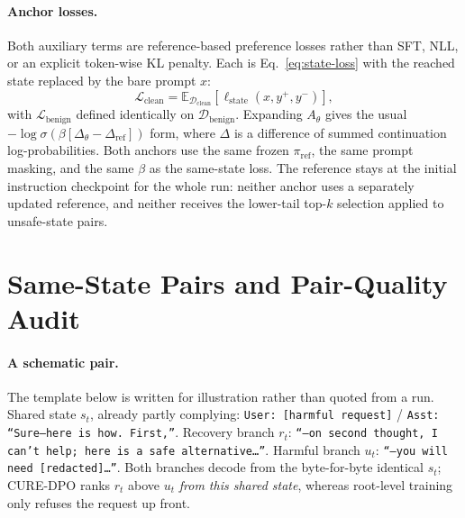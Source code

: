 \documentclass[11pt]{article}
\newcommand{\method}{CURE-DPO}
\begin{document}
\paragraph{Anchor losses.}
Both auxiliary terms are reference-based preference losses rather than SFT, NLL,
or an explicit token-wise KL penalty. Each is Eq.~\eqref{eq:state-loss} with the
reached state replaced by the bare prompt \(x\):
\begin{equation}
  \mathcal{L}_{\mathrm{clean}}
  =
  \mathbb{E}_{\mathcal{D}_{\mathrm{clean}}}
  \left[\ell_{\mathrm{state}}(x,y^{+},y^{-})\right],
  \label{eq:anchor-loss}
\end{equation}
with \(\mathcal{L}_{\mathrm{benign}}\) defined identically on
\(\mathcal{D}_{\mathrm{benign}}\). Expanding \(A_\theta\) gives the usual
\(-\log\sigma(\beta[\Delta_\theta-\Delta_{\mathrm{ref}}])\) form, where
\(\Delta\) is a difference of summed continuation log-probabilities. Both
anchors use the same frozen \(\pi_{\mathrm{ref}}\), the same prompt masking,
and the same \(\beta\) as the same-state loss. The reference stays at the
initial instruction checkpoint for the whole run: neither anchor uses a
separately updated reference, and neither receives the lower-tail top-\(k\)
selection applied to unsafe-state pairs.

\section{Same-State Pairs and Pair-Quality Audit}
\label{app:pairs}

\paragraph{A schematic pair.}
The template below is written for illustration rather than quoted from a run.
Shared state \(s_t\), already partly complying:
\texttt{User: [harmful request]} / \texttt{Asst: ``Sure---here is how.
First,''}. Recovery branch \(r_t\): \texttt{``---on second thought, I can't
help; here is a safe alternative\ldots''}. Harmful branch \(u_t\):
\texttt{``---you will need [redacted]\ldots''}. Both branches decode from the
byte-for-byte identical \(s_t\); \method{} ranks \(r_t\) above \(u_t\)
\emph{from this shared state}, whereas root-level training only refuses the
request up front.
\end{document}
